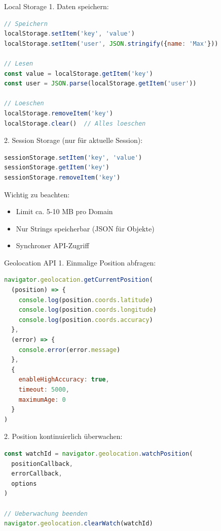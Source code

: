 \begin{KR}{Local Storage}
1. Daten speichern:
\begin{lstlisting}[language=JavaScript, style=basesmol]
// Speichern
localStorage.setItem('key', 'value')
localStorage.setItem('user', JSON.stringify({name: 'Max'}))

// Lesen
const value = localStorage.getItem('key')
const user = JSON.parse(localStorage.getItem('user'))

// Loeschen
localStorage.removeItem('key')
localStorage.clear()  // Alles loeschen
\end{lstlisting}

2. Session Storage (nur für aktuelle Session):
\begin{lstlisting}[language=JavaScript, style=basesmol]
sessionStorage.setItem('key', 'value')
sessionStorage.getItem('key')
sessionStorage.removeItem('key')
\end{lstlisting}

Wichtig zu beachten:
\begin{itemize}
  \item Limit ca. 5-10 MB pro Domain
  \item Nur Strings speicherbar (JSON für Objekte)
  \item Synchroner API-Zugriff
\end{itemize}
\end{KR}

\begin{KR}{Geolocation API}
1. Einmalige Position abfragen:
\begin{lstlisting}[language=JavaScript, style=basesmol]
navigator.geolocation.getCurrentPosition(
  (position) => {
    console.log(position.coords.latitude)
    console.log(position.coords.longitude)
    console.log(position.coords.accuracy)
  },
  (error) => {
    console.error(error.message)
  },
  {
    enableHighAccuracy: true,
    timeout: 5000,
    maximumAge: 0
  }
)
\end{lstlisting}

2. Position kontinuierlich überwachen:
\begin{lstlisting}[language=JavaScript, style=basesmol]
const watchId = navigator.geolocation.watchPosition(
  positionCallback,
  errorCallback,
  options
)

// Ueberwachung beenden
navigator.geolocation.clearWatch(watchId)
\end{lstlisting}
\end{KR}

